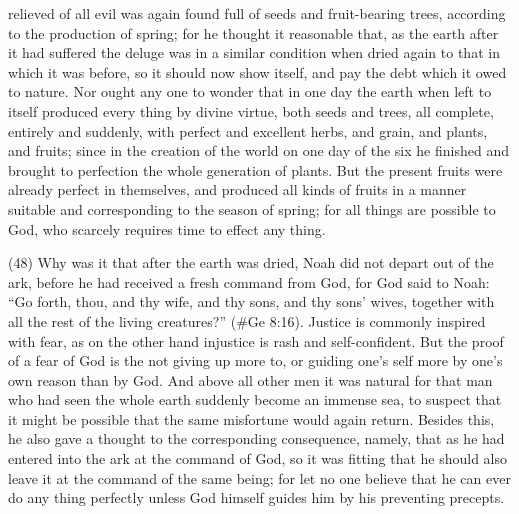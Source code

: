relieved of all evil was again found full of seeds and fruit-bearing trees, according to the production
of spring; for he thought it reasonable that, as the earth after it had suffered the deluge was in a
similar condition when dried again to that in which it was before, so it should now show itself, and
pay the debt which it owed to nature. Nor ought any one to wonder that in one day the earth when
left to itself produced every thing by divine virtue, both seeds and trees, all complete, entirely and
suddenly, with perfect and excellent herbs, and grain, and plants, and fruits; since in the creation of
the world on one day of the six he finished and brought to perfection the whole generation of plants.
But the present fruits were already perfect in themselves, and produced all kinds of fruits in a
manner suitable and corresponding to the season of spring; for all things are possible to God, who
scarcely requires time to effect any thing.

(48) Why was it that after the earth was dried, Noah did not depart out of the ark, before he had
received a fresh command from God, for God said to Noah: ``Go forth, thou, and thy wife, and thy
sons, and thy sons' wives, together with all the rest of the living creatures?'' (\#Ge 8:16).
Justice is commonly inspired with fear, as on the other hand injustice is rash and self-confident.
But the proof of a fear of God is the not giving up more to, or guiding one's self more by one's own
reason than by God. And above all other men it was natural for that man who had seen the whole
earth suddenly become an immense sea, to suspect that it might be possible that the same
misfortune would again return. Besides this, he also gave a thought to the corresponding
consequence, namely, that as he had entered into the ark at the command of God, so it was fitting
that he should also leave it at the command of the same being; for let no one believe that he can
ever do any thing perfectly unless God himself guides him by his preventing precepts.

